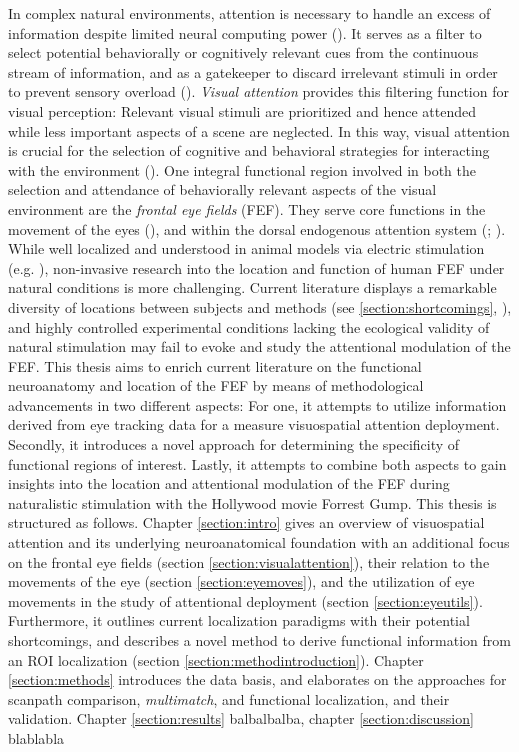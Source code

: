 \documentclass[a4paper, 12pt]{scrreprt}
\begin{document}
In complex natural environments, attention is necessary to handle an excess of information despite limited neural computing power (\cite{carrasco2011visual}). It serves as a filter to select potential behaviorally or cognitively relevant cues from the continuous stream of information, and as a gatekeeper to discard irrelevant stimuli in order to prevent sensory overload (\cite{bellebaum2012neuropsych}). \textit{Visual attention} provides this filtering function for visual perception: Relevant visual stimuli are prioritized and hence attended while less important aspects of a scene are neglected. In this way, visual attention is crucial for the selection of cognitive and behavioral strategies for interacting with the environment (\cite{siegelbaum2000neuro}).\newline
One integral functional region involved in both the selection and attendance of behaviorally relevant aspects of the visual environment are the \textit{frontal eye fields} (FEF). They serve core functions in the movement of the eyes (\cite{krauzlis2014eye}), and within the dorsal endogenous attention system (\cite{corbetta2002control}; \cite{corbetta2008reorienting}). While well localized and understood in animal models via electric stimulation (e.g. \cite{bruce1985primate}), non-invasive research into the location and function of human FEF under natural conditions is more challenging. Current literature displays a remarkable diversity of locations between subjects and methods (see \ref{section:shortcomings}, \cite{vernet2014corrigendum}), and highly controlled experimental conditions lacking the ecological validity of natural stimulation may fail to evoke and study the attentional modulation of the FEF. \newline
This thesis aims to enrich current literature on the functional neuroanatomy and location of the FEF by means of methodological advancements in two different aspects: For one, it attempts to utilize information derived from eye tracking data for a measure visuospatial attention deployment. Secondly, it introduces a novel approach for determining the specificity of functional regions of interest. Lastly, it attempts to combine both aspects to gain insights into the location and attentional modulation of the FEF during naturalistic stimulation with the Hollywood movie Forrest Gump. \newline
This thesis is structured as follows. Chapter \ref{section:intro} gives an overview of visuospatial attention and its underlying neuroanatomical foundation with an additional focus on the frontal eye fields (section \ref{section:visualattention}), their relation to the movements of the eye (section \ref{section:eyemoves}), and the utilization of eye movements in the study of attentional deployment (section \ref{section:eyeutils}). Furthermore, it outlines current localization paradigms with their potential shortcomings, and describes a novel method to derive functional information from an ROI localization (section \ref{section:methodintroduction}). Chapter \ref{section:methods} introduces the data basis, and elaborates on the approaches for scanpath comparison, \textit{multimatch}, and functional localization, and their validation. Chapter \ref{section:results} balbalbalba, chapter \ref{section:discussion} blablabla
\end{document}
